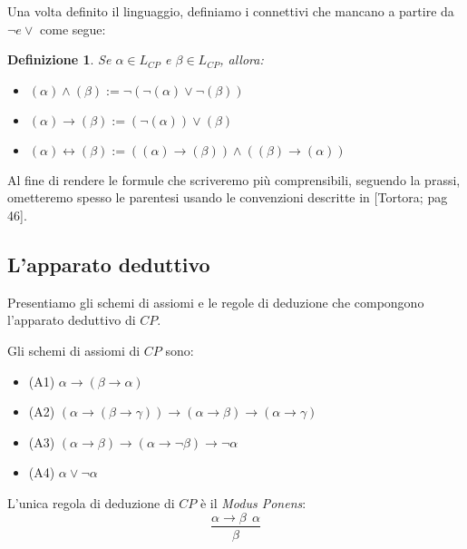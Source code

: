 \documentclass[a4paper, 12pt]{article}
\newtheorem{definition}{Definizione}
\begin{document}
Una volta definito il linguaggio, definiamo i connettivi che mancano a partire da $\neg e \lor$
come segue:
\begin{definition}
Se $\alpha \in L_{CP}$ e $\beta \in L_{CP}$, allora:
\begin{itemize}
\item $(\alpha) \land (\beta) := \neg(\neg(\alpha) \lor \neg(\beta))$
\item $(\alpha) \rightarrow (\beta) := (\neg(\alpha)) \lor (\beta)$
\item $(\alpha) \leftrightarrow (\beta) := ((\alpha) \rightarrow (\beta)) \land ((\beta) \rightarrow (\alpha))$
\end{itemize}
\end{definition}

Al fine di rendere le formule che scriveremo più comprensibili, seguendo la prassi,
ometteremo spesso le parentesi usando le convenzioni descritte in [Tortora; pag 46].

\subsection{L'apparato deduttivo}
Presentiamo gli schemi di assiomi e le regole di deduzione
che compongono l'apparato deduttivo di $CP$.

Gli schemi di assiomi di $CP$ sono:
\begin{itemize}
\item (A1) $\alpha \rightarrow (\beta \rightarrow \alpha)$
\item (A2) $(\alpha \rightarrow (\beta \rightarrow \gamma)) \rightarrow (\alpha \rightarrow \beta) \rightarrow (\alpha \rightarrow \gamma)$
\item (A3) $(\alpha \rightarrow \beta) \rightarrow (\alpha \rightarrow \neg \beta) \rightarrow \neg \alpha$
\item (A4) $\alpha \lor \neg \alpha$
\end{itemize}

L'unica regola di deduzione di $CP$ è il \textit{Modus Ponens}:
$$\frac{\alpha \rightarrow \beta \ \ \alpha}{\beta}$$
\end{document}
